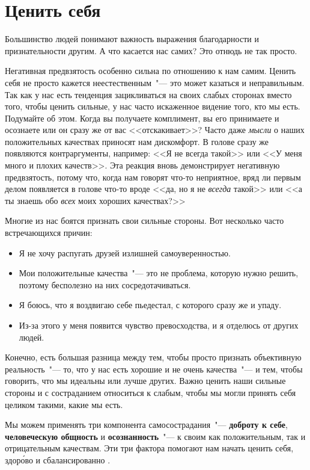 
\chapter{Ценить себя} \label{Self-Appreciation}

Большинство людей понимают важность выражения благодарности и признательности другим. А что касается нас самих? Это отнюдь не так просто.

Негативная предвзятость особенно сильна по отношению к нам самим. Ценить себя не просто кажется неестественным~"--- это может казаться и неправильным. Так как у нас есть тенденция зацикливаться на своих слабых сторонах вместо того, чтобы ценить сильные, у нас часто искаженное видение того, кто мы есть. Подумайте об этом. Когда вы получаете комплимент, вы его принимаете и осознаете или он сразу же от вас <<отскакивает>>? Часто даже \emph{мысли} о наших положительных качествах приносят нам дискомфорт. В голове сразу же появляются контраргументы, например: <<Я не всегда такой>> или <<У меня много и плохих качеств>>. Эта реакция вновь демонстрирует негативную предвзятость, потому что, когда нам говорят что-то неприятное, вряд ли первым делом появляется в голове что-то вроде <<да, но я не \emph{всегда} такой>> или <<а ты знаешь обо \emph{всех} моих хороших качествах?>> 

Многие из нас боятся признать свои сильные стороны. Вот несколько часто встречающихся причин:

\begin{itemize}
	\item Я не хочу распугать друзей излишней самоуверенностью. 
	\item Мои положительные качества~"--- это не проблема, которую нужно решить, поэтому бесполезно на них сосредотачиваться. 
	\item Я боюсь, что я воздвигаю себе пьедестал, с которого сразу же и упаду. 
	\item Из-за этого у меня появится чувство превосходства, и я отделюсь от других людей.
\end{itemize}

Конечно, есть большая разница между тем, чтобы просто признать объективную реальность~"--- то, что у нас есть хорошие и не очень качества~"--- и тем, чтобы говорить, что мы идеальны или лучше других. Важно ценить наши сильные стороны и с состраданием относиться к слабым, чтобы мы могли принять себя целиком такими, какие мы есть. 

Мы можем применять три компонента самосострадания~"--- \textbf{доброту к себе}, \textbf{человеческую общность} и \textbf{осознанность}~"--- к своим как положительным, так и отрицательным качествам. Эти три фактора помогают нам начать ценить себя, здор\'{о}во и сбалансированно \cite{130}. 

